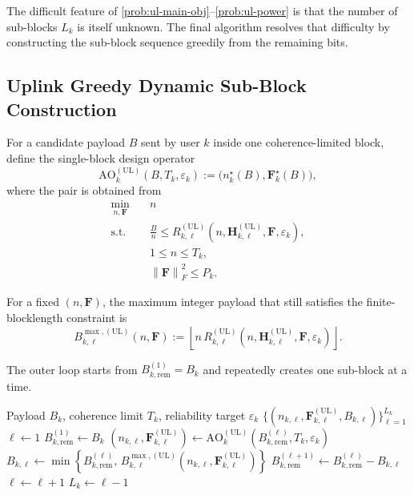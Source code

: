 \documentclass[11pt]{article}
\newcommand{\F}{\mathbf{F}}
\newcommand{\Hc}{\mathbf{H}}
\newcommand{\norm}[1]{\left\lVert #1 \right\rVert}
\newcommand{\floor}[1]{\left\lfloor #1 \right\rfloor}
\newcommand{\UL}{\mathrm{UL}}
\begin{document}
The difficult feature of \eqref{prob:ul-main-obj}--\eqref{prob:ul-power} is that the number of sub-blocks $L_k$ is itself unknown. The final algorithm resolves that difficulty by constructing the sub-block sequence greedily from the remaining bits.

\subsection{Uplink Greedy Dynamic Sub-Block Construction}
For a candidate payload $B$ sent by user $k$ inside one coherence-limited block, define the single-block design operator
\begin{equation}
\mathrm{AO}_k^{(\UL)}(B,T_k,\varepsilon_k)
:=
\bigl(n_k^\star(B), \F_k^\star(B)\bigr),
\label{eq:ul-ao-operator}
\end{equation}
where the pair is obtained from
\begin{subequations}
\begin{align}
\min_{n,\F}\quad
& n
\label{prob:ul-single-obj}
\\
\text{s.t.}\quad
&
\frac{B}{n}
\le
R_{k,\ell}^{(\UL)}(n,\Hc_{k,\ell}^{(\UL)},\F,\varepsilon_k),
\label{prob:ul-single-rate}
\\
&
1 \le n \le T_k,
\label{prob:ul-single-n}
\\
&
\norm{\F}_F^2 \le P_k.
\label{prob:ul-single-power}
\end{align}
\end{subequations}

For a fixed $(n,\F)$, the maximum integer payload that still satisfies the finite-blocklength constraint is
\begin{equation}
B_{k,\ell}^{\max,(\UL)}(n,\F)
:=
\floor{
n\,R_{k,\ell}^{(\UL)}(n,\Hc_{k,\ell}^{(\UL)},\F,\varepsilon_k)
}.
\label{eq:ul-bmax}
\end{equation}

The outer loop starts from $B_{k,\mathrm{rem}}^{(1)} = B_k$ and repeatedly creates one sub-block at a time.

\begin{algorithm}[ht]
\caption{Greedy Uplink Sub-Block Construction for User $k$}
\label{alg:ul-greedy}
\begin{algorithmic}[1]
\Require Payload $B_k$, coherence limit $T_k$, reliability target $\varepsilon_k$
\Ensure $\{(n_{k,\ell},\F_{k,\ell}^{(\UL)},B_{k,\ell})\}_{\ell=1}^{L_k}$
\State $\ell \gets 1$
\State $B_{k,\mathrm{rem}}^{(1)} \gets B_k$
    \State $(n_{k,\ell},\F_{k,\ell}^{(\UL)}) \gets \mathrm{AO}_k^{(\UL)}(B_{k,\mathrm{rem}}^{(\ell)},T_k,\varepsilon_k)$
    \State $B_{k,\ell} \gets \min\!\left\{B_{k,\mathrm{rem}}^{(\ell)},\,
    B_{k,\ell}^{\max,(\UL)}(n_{k,\ell},\F_{k,\ell}^{(\UL)})\right\}$
    \State $B_{k,\mathrm{rem}}^{(\ell+1)} \gets B_{k,\mathrm{rem}}^{(\ell)} - B_{k,\ell}$
    \State $\ell \gets \ell + 1$
\EndWhile
\State $L_k \gets \ell - 1$
\end{algorithmic}
\end{algorithm}
\end{document}

